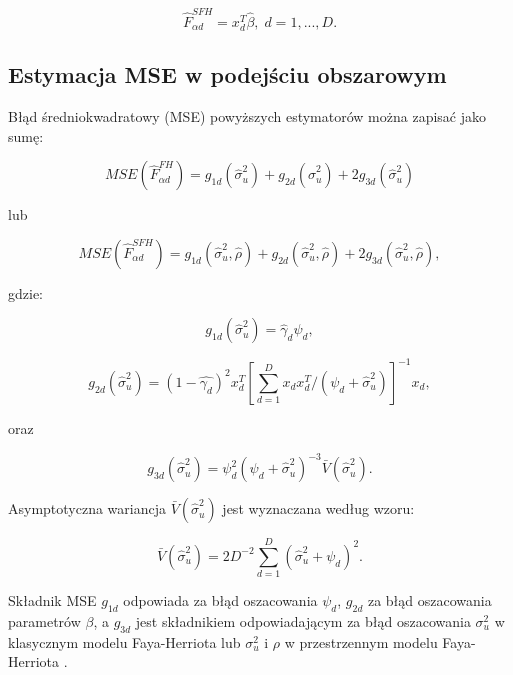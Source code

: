 \begin{equation}
\hat{F}_{\alpha d}^{SFH}=x_d^{T}\hat{\beta}, \; d=1, ..., D.
\end{equation}

\subsection{Estymacja MSE w podejściu obszarowym}

Błąd średniokwadratowy (MSE) powyższych estymatorów można zapisać jako sumę:

\begin{equation}
MSE(\hat{F}_{\alpha d}^{FH})=g_{1d}(\hat{\sigma}_u^2)+g_{2d}(\hat{\sigma}_u^2)+2g_{3d}(\hat{\sigma}_u^2)
\end{equation}

lub

\begin{equation}
MSE(\hat{F}_{\alpha d}^{SFH})=g_{1d}(\hat{\sigma}_u^2,\hat{\rho})+g_{2d}(\hat{\sigma}_u^2,\hat{\rho})+2g_{3d}(\hat{\sigma}_u^2,\hat{\rho}),
\end{equation}

gdzie:

\begin{equation}
g_{1d}(\hat{\sigma}_{u}^{2})=\hat{\gamma}_{d}\psi_{d},
\end{equation}

\begin{equation}
g_{2d}(\hat{\sigma}_{u}^{2})=(1-\hat{\gamma_{d}})^2 x_{d}^{T}\left[\sum\limits_{d=1}^{D}{x_{d}x_{d}^{T}}/(\psi_{d}+\hat{\sigma}_{u}^{2})\right]^{-1}x_{d},
\end{equation}

oraz

\begin{equation}
g_{3d}(\hat{\sigma}_{u}^{2})=\psi_{d}^{2}(\psi_{d}+\hat{\sigma}_{u}^{2})^{-3}\bar{V}(\hat{\sigma}_{u}^{2}).
\end{equation}

Asymptotyczna wariancja $\bar{V}(\hat{\sigma}_{u}^{2})$ jest wyznaczana według wzoru:

\begin{equation}
\bar{V}(\hat{\sigma}_{u}^{2})=2D^{-2}\sum\limits_{d=1}^{D}{(\hat{\sigma}_{u}^{2}+\psi_{d})^2}.
\end{equation}

Składnik MSE $g_{1d}$ odpowiada za błąd oszacowania $\psi_d$, $g_{2d}$ za błąd oszacowania parametrów $\beta$, a $g_{3d}$ jest składnikiem odpowiadającym za błąd oszacowania $\sigma_u^2$ w klasycznym modelu Faya-Herriota lub $\sigma_u^2$ i $\rho$ w przestrzennym modelu Faya-Herriota \citep{singh2005}.

